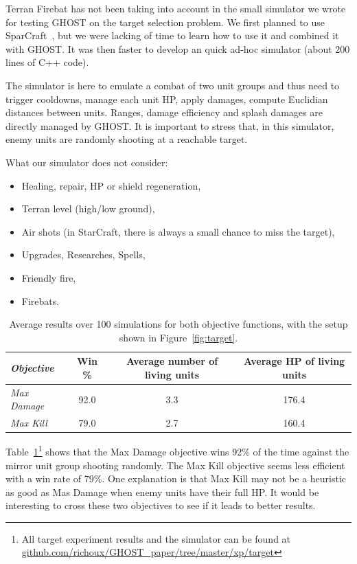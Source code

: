 \documentclass[journal]{IEEEtran}
\newcommand{\ghost}{\textsc{GHOST}\xspace}
\begin{document}
Terran Firebat has not been taking into account in the small simulator
we wrote for testing \ghost on the target selection problem.  We first
planned    to    use   SparCraft~\cite{ChurchillB11,    ChurchillSB12,
  ChurchillB12}, but  we were lacking of  time to learn how  to use it
and combined  it with \ghost. It  was then faster to  develop an quick
ad-hoc simulator (about 200 lines of C++ code). 

The simulator is here to emulate a  combat of two unit groups and thus
need to trigger cooldowns, manage each unit HP, apply damages, compute
Euclidian  distances  between  units. Ranges,  damage  efficiency  and
splash damages  are directly  managed by \ghost.   It is  important to
stress that, in this simulator, enemy units are randomly shooting at a
reachable target.

What our simulator does not consider:
\begin{itemize}
\item Healing, repair, HP or shield regeneration,
\item Terran level (high/low ground),
\item Air shots (in StarCraft, there is always a small chance to miss
  the target),
\item Upgrades, Researches, Spells,
\item Friendly fire,
\item Firebats.
\end{itemize}

\begin{table}[h!]
  \centering
  \caption{Average  results over  100 simulations  for both  objective
    functions, with the setup shown in Figure~\ref{fig:target}.}
  \label{tab:target}
  \begin{tabular}{|l|c|c|c|} 
    \hline
    {\em Objective} & Win \% & Average number of living units & Average HP of living units\\
    \hline
    {\em Max Damage} & 92.0 & 3.3 & 176.4\\
    {\em Max Kill} & 79.0 & 2.7 & 160.4\\
    \hline
  \end{tabular}
\end{table}

Table~\ref{tab:target}\footnote{All target experiment  results and the
  simulator            can            be           found            at
  \href{https://github.com/richoux/GHOST\_paper/tree/master/xp/target}{github.com/richoux/GHOST\_paper/tree/master/xp/target}}
shows that the Max Damage objective  wins 92\% of the time against the
mirror unit group shooting randomly. The Max Kill objective seems less
efficient with  a win rate of  79\%. One explanation is  that Max Kill
may not  be a heuristic  as good as Mas  Damage when enemy  units have
their full HP.  It would be  interesting to cross these two objectives
to see if it leads to better results.
\end{document}

